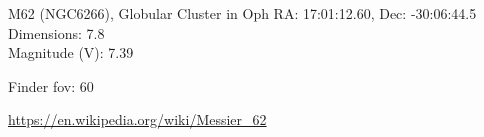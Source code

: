 \begin{block}{M62 (NGC6266), Globular Cluster in Oph}
    RA: 17:01:12.60, Dec: -30:06:44.5 \\ 
    Dimensions: 7.8 \\ 
    Magnitude (V): 7.39



    Finder fov: 60 

    \url{https://en.wikipedia.org/wiki/Messier_62} 
\end{block}